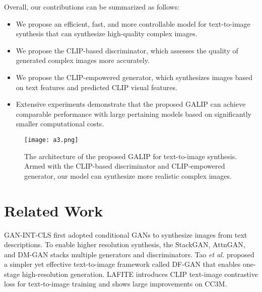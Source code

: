 \documentclass[10pt,twocolumn,letterpaper]{article}
\begin{document}
Overall, our contributions can be summarized as follows:
\begin{itemize}
    \item We propose an efficient, fast, and more controllable model for text-to-image synthesis that can synthesize high-quality complex images.
    \item We propose the CLIP-based discriminator, which assesses the quality of generated complex images more accurately.
    \item We propose the CLIP-empowered generator, which synthesizes images based on text features and predicted CLIP visual features.
    \item Extensive experiments demonstrate that the proposed GALIP can achieve comparable performance with large pertaining models based on significantly smaller computational costs.
\end{itemize}

\begin{figure*}[t]
  \centering
  \texttt{[image: a3.png]}
  \caption{The architecture of the proposed GALIP for text-to-image synthesis. Armed with the CLIP-based discriminator and CLIP-empowered generator, our model can synthesize more realistic complex images.}
  \label{fig2}
  \vspace{-0.4cm}
\end{figure*}


\section{Related Work}

GAN-INT-CLS \cite{reed2016generative} first adopted conditional GANs to synthesize images from text descriptions.
To enable higher resolution synthesis, the StackGAN\cite{zhang2017stackgan,zhang2018stackgan}, AttnGAN\cite{xu2018attngan}, and DM-GAN \cite{zhu2019dm} stacks multiple generators and discriminators. 
Tao \emph{et al.} \cite{tao2020df} proposed a simpler yet effective text-to-image framework called DF-GAN that enables one-stage high-resolution generation.
LAFITE \cite{zhou2022towards} introduces CLIP text-image contrastive loss for text-to-image training and shows large improvements on CC3M\cite{sharma2018conceptual}. 
\end{document}
